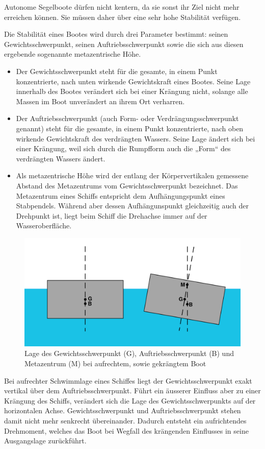 Autonome Segelboote dürfen nicht kentern, da sie sonst ihr Ziel nicht mehr erreichen können. Sie müssen daher über eine sehr hohe Stabilität verfügen.

Die Stabilität eines Bootes wird durch drei Parameter bestimmt: seinen Gewichtsschwerpunkt, seinen Auftriebsschwerpunkt sowie die sich aus diesen ergebende sogenannte metazentrische Höhe.\cite{noauthor_stabilitat_2023-1}  
\begin{itemize}
    \item Der Gewichtsschwerpunkt steht für die gesamte, in einem Punkt konzentrierte, nach unten wirkende Gewichtskraft eines Bootes. Seine Lage innerhalb des Bootes verändert sich bei einer Krängung nicht, solange alle Massen im Boot unverändert an ihrem Ort verharren.
    \item Der Auftriebsschwerpunkt (auch Form- oder Verdrängungsschwerpunkt genannt) steht für die gesamte, in einem Punkt konzentrierte, nach oben wirkende Gewichtskraft des verdrängten Wassers. Seine Lage ändert sich bei einer Krängung, weil sich durch die Rumpfform auch die „Form“ des verdrängten Wassers ändert.
    \item Als metazentrische Höhe wird der entlang der Körpervertikalen gemessene Abstand des Metazentrums vom Gewichtsschwerpunkt bezeichnet. Das Metazentrum eines Schiffs entspricht dem Aufhängungspunkt eines Stabpendels. Während aber dessen  Aufhängunspunkt gleichzeitig auch der Drehpunkt ist, liegt beim Schiff die Drehachse immer auf der Wasseroberfläche.\cite{noauthor_metazentrische_nodate}
\end{itemize}
\begin{figure}[H]
    \centering
    \includegraphics[width=0.75\linewidth]{Metacentriskhojd-svg.svg.png}
    \caption{Lage des Gewichtsschwerpunkt (G), Auftriebsschwerpunkt (B) und Metazentrum (M) bei aufrechtem, sowie gekrängtem Boot }
    \label{fig:enter-label}
\end{figure}
Bei aufrechter Schwimmlage eines Schiffes liegt der Gewichtsschwerpunkt exakt vertikal über dem Auftriebsschwerpunkt. Führt ein äusserer Einfluss aber zu einer Krängung des Schiffs, verändert sich die Lage des Gewichtsschwerpunkts auf der horizontalen Achse. Gewichtsschwerpunkt und Auftriebsschwerpunkt stehen damit nicht mehr senkrecht übereinander. Dadurch entsteht ein aufrichtendes Drehmoment, welches das Boot bei Wegfall des krängenden Einflusses in seine Ausgangslage zurückführt.


